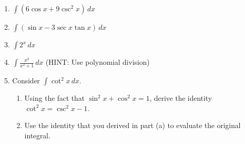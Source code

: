 \documentclass[12pt]{article}
\newif\ifans
\begin{document}
\begin{enumerate}
\item $\int \left(6\cos{x}+9\csc^{2}{x}\right) \,dx$ 

\ifans{\fbox{$6\sin{x}-9\cot{x}+C$}} \fi

\item $\int \left(\sin{x}-3\sec{x}\tan{x}\right) \,dx$ 

\ifans{\fbox{$-\cos{x}-3\sec{x}+C$}} \fi

\item $\int 2^{x} \,dx$ 

\ifans{\fbox{$\frac{2^{x}}{\ln{2}}+C$}} \fi

\item $\int \frac{x^2}{x^2+1} \,dx$ (HINT: Use polynomial division)

\ifans{\fbox{$x-\arctan{x}+C$}} \fi

\item Consider $\int{\cot^{2}{x}} \,dx$.

\begin{enumerate}

\item Using the fact that $\sin^{2}{x}+\cos^{2}{x}=1$, derive the identity $\cot^2{x}=\csc^{2}{x}-1$.

\ifans{\fbox{\parbox{1\linewidth}{ Provided that $x \neq \pi \cdot k$, where $k$ is any integer, we have:
\begin{align*} 
\sin^{2}{x}+\cos^{2}{x} &=1\\
\frac{\sin^{2}{x}}{\sin^{2}{x}}+\frac{\cos^{2}{x}}{\sin^2{x}}&=\frac{1}{\sin^2{x}}\\
1+\cot^2{x}&=\csc^2{x}\\
\cot^2{x}&=\csc^2{x}-1
\end{align*}
}}} \fi

\item Use the identity that you derived in part (a) to evaluate the original integral.

\ifans{\fbox{$\int{\cot^{2}{x}} \,dx=-\cot{x}-x+C$.}} \fi

\end{enumerate}

\end{enumerate}

\end{document}
